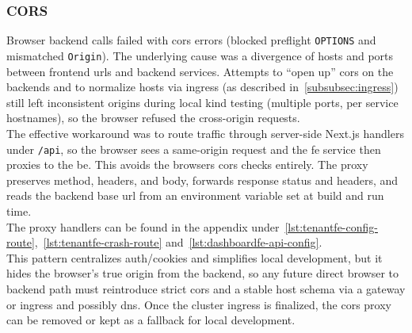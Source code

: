 \documentclass[11pt, a4paper, oneside, listof=totoc]{scrartcl}
\begin{document}
            \subsubsection{CORS}\label{subsubsec:challengesCORS}
                Browser backend calls failed with \gls{cors} errors (blocked preflight
                \texttt{OPTIONS} and mismatched \texttt{Origin}).
                The underlying cause was a divergence of hosts and ports between frontend
                \glspl{url} and backend services.
                Attempts to \enquote{open up} \gls{cors} on the backends and to normalize hosts via
                ingress (as described in~\autoref{subsubsec:ingress}) still left inconsistent
                origins during local \gls{kind} testing (multiple ports, per service hostnames),
                so the browser refused the cross-origin requests.\\
                The effective workaround was to route traffic through server-side Next.js handlers
                under \texttt{/api}, so the browser sees a same-origin request and the \gls{fe}
                service then proxies to the \gls{be}.
                This avoids the browsers \gls{cors} checks entirely.
                The proxy preserves method, headers, and body, forwards response status and headers,
                and reads the backend base \gls{url} from an environment variable set at build and
                run time.\\
                The proxy handlers can be found in the appendix
                under~\autoref{lst:tenantfe-config-route},~\autoref{lst:tenantfe-crash-route}
                and~\autoref{lst:dashboardfe-api-config}.\\
                This pattern centralizes auth/cookies and simplifies local development, but it hides
                the browser's true origin from the backend, so any future direct browser to backend
                path must reintroduce strict \gls{cors} and a stable host schema via a gateway or
                ingress and possibly \gls{dns}.
                Once the cluster ingress is finalized, the \gls{cors} proxy can be removed or
                kept as a fallback for local development.
\end{document}
